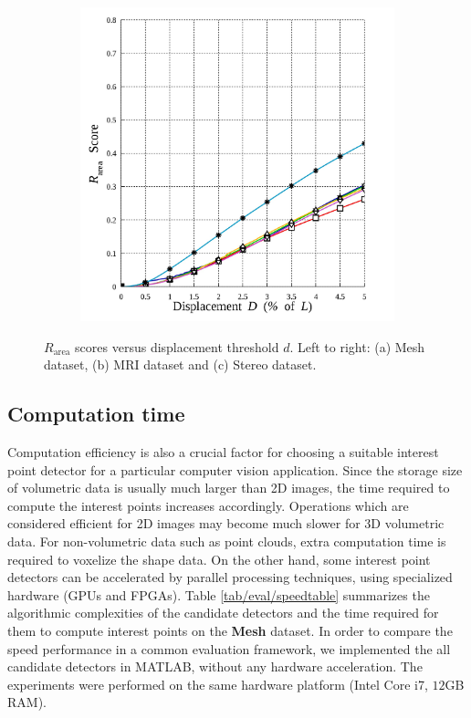 \begin{figure}[ht]
\begin{subfigure}[t]{0.49\linewidth}
		\label{fig/eval/graph_mri}
	\end{subfigure}
	\begin{subfigure}[t]{0.49\linewidth}
		\centering 
		\includegraphics[width=0.95\linewidth]{./fig/eval/graph_stereo.jpg}
		\label{fig/eval/graph_mvs}
	\end{subfigure}
\caption{$R_{\textrm{area}}$ scores versus displacement threshold $d$. Left to right: (a) Mesh dataset, (b) MRI dataset and (c) Stereo dataset.}
\label{fig/eval/graph2}
\end{figure}

\subsection{Computation time}
Computation efficiency is also a crucial factor for choosing a suitable interest point detector for a particular computer vision application. Since the storage size of volumetric data is usually much larger than 2D images, the time required to compute the interest points increases accordingly. Operations which are considered efficient for 2D images may become much slower for 3D volumetric data. For non-volumetric data such as point clouds, extra computation time is required to voxelize the shape data. On the other hand, some interest point detectors can be accelerated by parallel processing techniques, using specialized hardware (\eg GPUs and FPGAs). Table \ref{tab/eval/speedtable} summarizes the algorithmic complexities of the candidate detectors and the time required for them to compute interest points on the \textbf{Mesh} dataset. In order to compare the speed performance in a common evaluation framework, we implemented the all candidate detectors in MATLAB, without any hardware acceleration. The experiments were performed on the same hardware platform (Intel Core i7, $12$GB RAM). 

